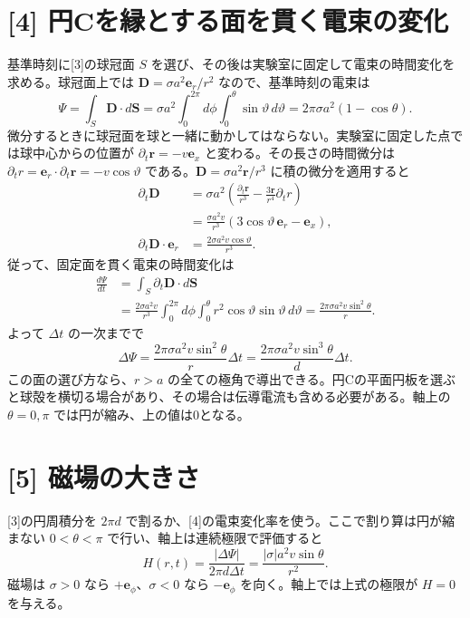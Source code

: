 \documentclass[11pt,a4paper]{article}
\begin{document}
\section*{[4] 円Cを縁とする面を貫く電束の変化}
基準時刻に[3]の球冠面 $S$ を選び、その後は実験室に固定して電束の時間変化を求める。球冠面上では $\boldsymbol D=\sigma a^2\boldsymbol e_r/r^2$ なので、基準時刻の電束は
\begin{equation}
 \Psi=\int_S\boldsymbol D\cdot d\boldsymbol S
 =\sigma a^2\int_0^{2\pi}d\phi\int_0^\theta\sin\vartheta\,d\vartheta
 =2\pi\sigma a^2(1-\cos\theta).
\end{equation}
微分するときに球冠面を球と一緒に動かしてはならない。実験室に固定した点では球中心からの位置が $\partial_t\boldsymbol r=-v\boldsymbol e_x$ と変わる。その長さの時間微分は $\partial_t r=\boldsymbol e_r\cdot\partial_t\boldsymbol r=-v\cos\vartheta$ である。$\boldsymbol D=\sigma a^2\boldsymbol r/r^3$ に積の微分を適用すると
\begin{align}
 \partial_t\boldsymbol D
 &=\sigma a^2\left(\frac{\partial_t\boldsymbol r}{r^3}
       -\frac{3\boldsymbol r}{r^4}\partial_t r\right)\\
 &=\frac{\sigma a^2v}{r^3}
 \left(3\cos\vartheta\,\boldsymbol e_r-\boldsymbol e_x\right),\\
 \partial_t\boldsymbol D\cdot\boldsymbol e_r
 &=\frac{2\sigma a^2v\cos\vartheta}{r^3}.
\end{align}
従って、固定面を貫く電束の時間変化は
\begin{align}
 \frac{d\Psi}{dt}
 &=\int_S\partial_t\boldsymbol D\cdot d\boldsymbol S\\
 &=\frac{2\sigma a^2v}{r^3}
   \int_0^{2\pi}d\phi\int_0^\theta r^2\cos\vartheta\sin\vartheta\,d\vartheta
 =\frac{2\pi\sigma a^2v\sin^2\theta}{r}.
\end{align}
よって $\Delta t$ の一次までで
\begin{equation}
 \boxed{\Delta\Psi=\frac{2\pi\sigma a^2v\sin^2\theta}{r}\Delta t
 =\frac{2\pi\sigma a^2v\sin^3\theta}{d}\Delta t.}
\end{equation}
この面の選び方なら、$r>a$ の全ての極角で導出できる。円Cの平面円板を選ぶと球殻を横切る場合があり、その場合は伝導電流も含める必要がある。軸上の $\theta=0,\pi$ では円が縮み、上の値は0となる。

\section*{[5] 磁場の大きさ}
[3]の円周積分を $2\pi d$ で割るか、[4]の電束変化率を使う。ここで割り算は円が縮まない $0<\theta<\pi$ で行い、軸上は連続極限で評価すると
\begin{equation}
 \boxed{H(r,t)=\frac{|\Delta\Psi|}{2\pi d\Delta t}
 =\frac{|\sigma|a^2v\sin\theta}{r^2}.}
\end{equation}
磁場は $\sigma>0$ なら $+\boldsymbol e_\phi$、$\sigma<0$ なら $-\boldsymbol e_\phi$ を向く。軸上では上式の極限が $H=0$ を与える。
\end{document}
